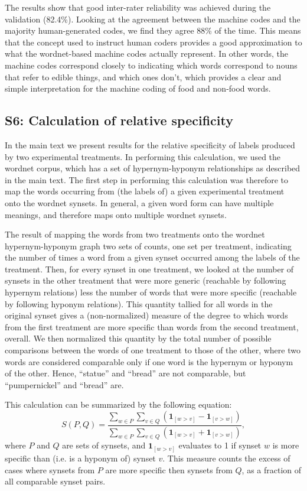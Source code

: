 \documentclass[12pt]{article}
\begin{document}
The results show that good inter-rater reliability was achieved during the
validation (82.4\%).  Looking at the agreement between the 
machine codes and the majority human-generated codes, we find they agree
88\% of the time.  This means that the concept used to instruct human coders
provides a good approximation to what the wordnet-based machine codes actually
represent. In other words, the machine codes correspond closely to indicating
which words correspond to nouns that refer to edible things, and which ones
don't, which provides a clear and simple interpretation for the machine
coding of food and non-food words.

\subsection*{S6: Calculation of relative specificity}
In the main text we present results for the relative specificity of labels
produced by two experimental treatments.  In performing this calculation,
we used the wordnet corpus, which has a set of hypernym-hyponym relationships
as described in the main text.  The first step in performing this calculation
was therefore to map the words occurring from (the labels of) a given 
experimental treatment onto the wordnet synsets.  In general, a given word
form can have multiple meanings, and therefore maps onto multiple wordnet 
synsets.

The result of mapping the words from two treatments onto the wordnet 
hypernym-hyponym graph two sets of counts, one set per treatment, 
indicating the number of times a word from a given synset occurred among the
labels of the treatment.  Then, for every synset in one treatment, we looked
at the number of synsets in the other treatment that were more generic
(reachable by following hypernym relations) less the number of words that
were more specific (reachable by following hyponym relations).  This quantity
tallied for all words in the original synset gives a (non-normalized) measure
of the degree to which words from the first treatment are more specific
than words from the second treatment, overall.  We then normalized this 
quantity by the total number of possible comparisons between the words of
one treatment to those of the other, where two words are considered comparable
only if one word is the hypernym or hyponym of the other.  Hence, ``statue'' 
and ``bread'' are not comparable, but ``pumpernickel'' and ``bread'' are.

This calculation can be summarized by the following equation:
\begin{equation}
	S(P,Q) = \frac{
		\sum_{w\in P}\sum_{v\in Q} \left(
			\mathbf{1}_{[w>v]} - \mathbf{1}_{[v>w]} \right)
	}{
		\sum_{w\in P}\sum_{v\in Q} \left(
			\mathbf{1}_{[w>v]} + \mathbf{1}_{[v>w]} \right)
	},
\end{equation}
where $P$ and $Q$ are sets of synsets, and $\mathbf{1}_{[w>v]}$ evaluates
to 1 if synset $w$ is more specific than (i.e. is a hyponym of) synset $v$.
This measure counts the excess of cases where synsets from $P$ are more
specific then synsets from $Q$, as a fraction of all comparable synset pairs. 
\end{document}
